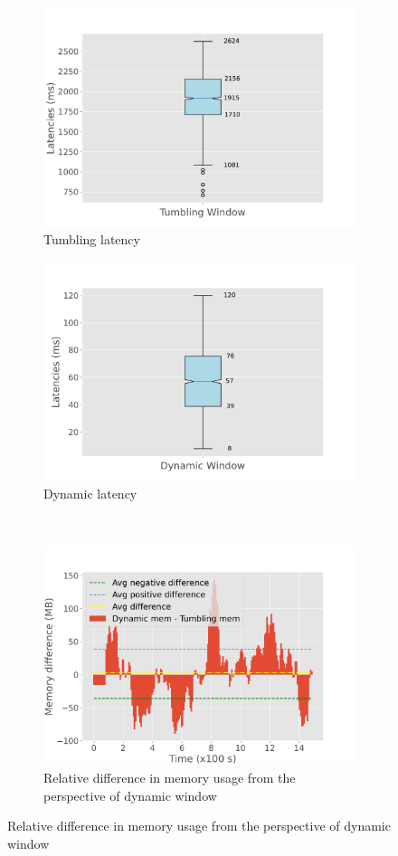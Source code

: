 \begin{figure}[htbp]
\begin{subfigure}[b]{0.5\columnwidth}
        \includegraphics[width=\columnwidth]{fig/constant-rate/TumblingWindow_latency_boxplot.pdf}
        \caption{Tumbling latency}
        \label{fig:constant_tumb_boxplot}
    \end{subfigure}
    \begin{subfigure}[b]{0.5\columnwidth}
        \includegraphics[width=\columnwidth]{fig/constant-rate/DynamicWindow_latency_boxplot.pdf}
        \caption{Dynamic latency}
        \label{fig:constant_dynamic_boxplot}
    \end{subfigure}
    \\
    \begin{subfigure}[b]{\columnwidth}
        \centering
        \includegraphics[width=0.5\columnwidth]{fig/constant-rate/mem_difference_bar.pdf}
        \caption{Relative difference in memory usage from the perspective of dynamic window}
        \label{fig:constant_mem_diff}
    \end{subfigure}


\end{figure}
